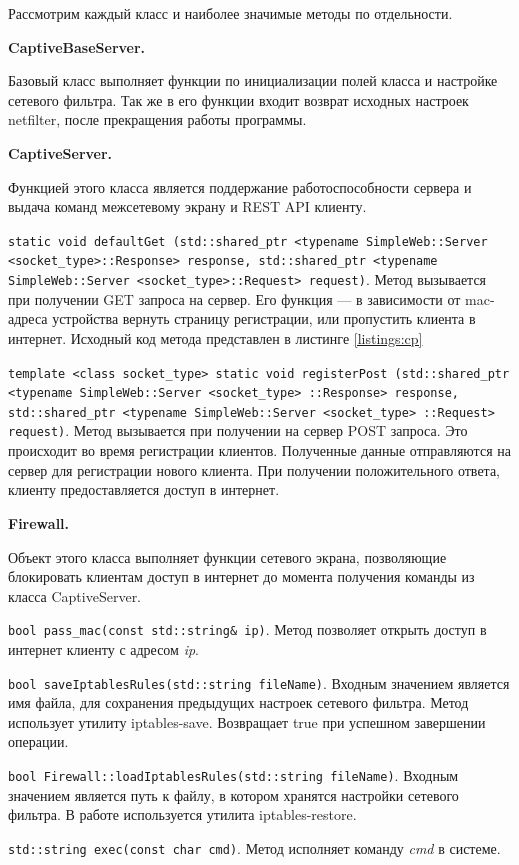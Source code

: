 Рассмотрим каждый класс и наиболее значимые методы по отдельности.

\textbf{CaptiveBaseServer.}

Базовый класс выполняет функции по инициализации полей класса и настройке сетевого фильтра. Так же в его функции входит возврат исходных настроек netfilter, после прекращения работы программы.

\textbf{CaptiveServer.}

Функцией этого класса является поддержание работоспособности сервера и выдача команд межсетевому экрану и REST API клиенту.

\texttt{static void defaultGet (std::shared\_ptr <typename  SimpleWeb::Server <socket\_type>::Response> response, std::shared\_ptr <typename SimpleWeb::Server <socket\_type>::Request> request)}. Метод вызывается при получении GET запроса на сервер. Его функция --- в зависимости от mac-адреса устройства вернуть страницу регистрации, или пропустить клиента в интернет. Исходный код метода представлен в листинге \ref{listings:cp}

\texttt{template <class socket\_type> static void registerPost (std::shared\_ptr <typename SimpleWeb::Server <socket\_type> ::Response> response, std::shared\_ptr <typename SimpleWeb::Server <socket\_type> ::Request> request)}. Метод вызывается при получении на сервер POST запроса. Это происходит во время регистрации клиентов. Полученные данные отправляются на сервер для регистрации нового клиента. При получении положительного ответа, клиенту предоставляется доступ в интернет.

\textbf{Firewall.}

Объект этого класса выполняет функции сетевого экрана, позволяющие блокировать клиентам доступ в интернет до момента получения команды из класса CaptiveServer.

\texttt{bool pass\_mac(const std::string\& ip)}. Метод позволяет открыть доступ в интернет клиенту с адресом \textit{ip}.

\texttt{bool saveIptablesRules(std::string fileName)}. Входным значением является имя файла, для сохранения предыдущих настроек сетевого фильтра. Метод использует утилиту iptables-save. Возвращает true при успешном завершении операции.

\texttt{bool Firewall::loadIptablesRules(std::string fileName)}. Входным значением является путь к файлу, в котором хранятся настройки сетевого фильтра. В работе используется утилита iptables-restore.

\texttt{std::string exec(const char\* cmd)}. Метод исполняет команду \textit{cmd} в системе.

